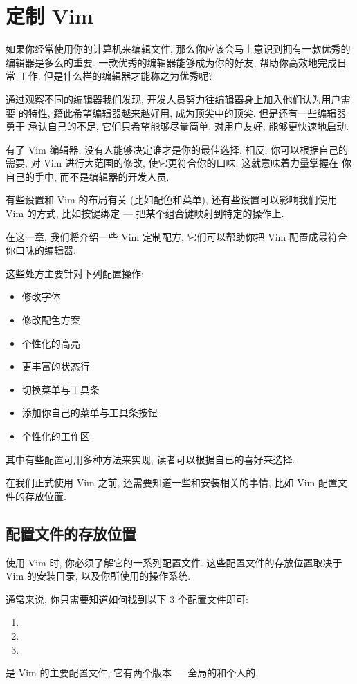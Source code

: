 \chapter{定制 Vim}
\label{chap:personalizing_vim}
如果你经常使用你的计算机来编辑文件, 那么你应该会马上意识到拥有一款优秀的
编辑器是多么的重要. 一款优秀的编辑器能够成为你的好友, 帮助你高效地完成日常
工作. 但是什么样的编辑器才能称之为优秀呢?

通过观察不同的编辑器我们发现, 开发人员努力往编辑器身上加入他们认为用户需要
的特性, 籍此希望编辑器越来越好用, 成为顶尖中的顶尖.  但是还有一些编辑器勇于
承认自己的不足, 它们只希望能够尽量简单, 对用户友好, 能够更快速地启动.

有了 Vim 编辑器, 没有人能够决定谁才是你的最佳选择. 相反, 你可以根据自己的
需要, 对 Vim 进行大范围的修改, 使它更符合你的口味. 这就意味着力量掌握在
你自己的手中, 而不是编辑器的开发人员.

有些设置和 Vim 的布局有关 (比如配色和菜单), 还有些设置可以影响我们使用
Vim 的方式, 比如按键绑定 --- 把某个组合键映射到特定的操作上.

在这一章, 我们将介绍一些 Vim 定制配方, 它们可以帮助你把 Vim 配置成最符合
你口味的编辑器.

这些处方主要针对下列配置操作:
\begin{itemize}
    \item 修改字体
    \item 修改配色方案
    \item 个性化的高亮
    \item 更丰富的状态行
    \item 切换菜单与工具条
    \item 添加你自己的菜单与工具条按钮
    \item 个性化的工作区
\end{itemize}
其中有些配置可用多种方法来实现, 读者可以根据自已的喜好来选择.

在我们正式使用 Vim 之前, 还需要知道一些和安装相关的事情, 比如 Vim
配置文件的存放位置.

\section{配置文件的存放位置}
\label{sec:where_the_configuration_files}
使用 Vim 时, 你必须了解它的一系列配置文件. 这些配置文件的存放位置取决于
Vim 的安装目录, 以及你所使用的操作系统.

通常来说, 你只需要知道如何找到以下 3 个配置文件即可:
\begin{enumerate}
    \item {}
    \item {}
    \item {}
\end{enumerate}
 是 Vim 的主要配置文件, 它有两个版本 --- 全局的和个人的.

